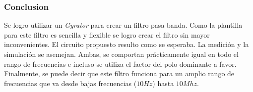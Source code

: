 \subsubsection{Conclusion}

Se logro utilizar un \textit{Gyrator} para crear un filtro pasa banda. Como la plantilla para este filtro es sencilla y flexible se logro crear el filtro sin mayor inconvenientes. El circuito propuesto resulto como se esperaba. La medición y la simulación se asemejan. Ambas, se comportan prácticamente igual en todo el rango de frecuencias e incluso se utiliza el factor del polo dominante a favor. Finalmente, se puede decir que este filtro funciona para un amplio rango de frecuencias que va desde bajas frecuencias ($10Hz$) hasta $10Mhz$. 











